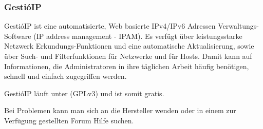 \documentclass[11pt,a4paper,parskip=half]{scrartcl}
\begin{document}
\subsubsection{GestióIP}
GestióIP ist eine automatisierte, Web basierte IPv4/IPv6 Adressen Verwaltungs-Software (IP address management - IPAM). Es verfügt über leistungsstarke Netzwerk Erkundungs-Funktionen und eine automatische Aktualisierung, sowie über Such- und Filterfunktionen für Netzwerke und für Hosts. Damit kann auf Informationen, die Administratoren in ihre täglichen Arbeit häufig benötigen, schnell und einfach zugegriffen werden. 

GestióIP läuft unter (GPLv3) und ist somit gratis.

Bei Problemen kann man sich an die Hersteller wenden oder in einem zur Verfügung gestellten Forum Hilfe suchen.
\end{document}
